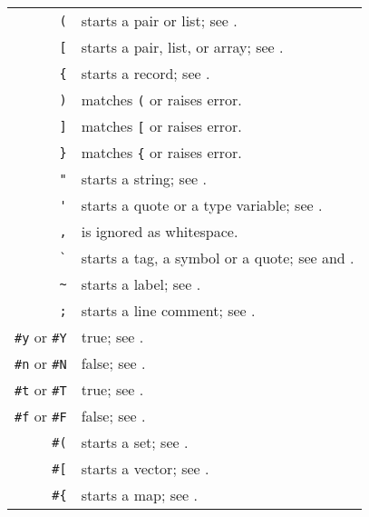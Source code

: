 \begin{table}
\begin{longtable}{ r l }
  \lstinline!(! & starts a pair or list; see \nameref{subsec:aml-base-lang-reader-lists}. \\
  \lstinline![! & starts a pair, list, or array; see \nameref{subsec:aml-base-lang-reader-lists}. \\
  \lstinline!{! & starts a record; see \nameref{subsec:aml-base-lang-reader-records}. \\
  \lstinline!)! & matches \lstinline!(! or raises error. \\
  \lstinline!]! & matches \lstinline![! or raises error. \\
  \lstinline!}! & matches \lstinline!{! or raises error. \\
  
\pagebreak[2]
  \lstinline!"! & starts a string; see \nameref{subsec:aml-base-lang-reader-strings}. \\
  \lstinline!'! & starts a quote or a type variable; see \nameref{subsec:aml-base-lang-reader-quotes}. \\
  \lstinline!,! & is ignored as whitespace. \\
  \lstinline!`! & starts a tag, a symbol or a quote; see \nameref{subsec:aml-base-lang-reader-polytags} and \nameref{subsec:aml-base-lang-reader-symbols}. \\
  \lstinline!~! & starts a label; see \nameref{subsec:aml-base-lang-reader-labels}. \\
  \lstinline!;! & starts a line comment; see \nameref{subsec:aml-base-lang-reader-comments}. \\
  
\pagebreak[2]
  \lstinline!#y! or \lstinline!#Y! & true; see \nameref{subsec:aml-base-lang-reader-booleans}. \\
  \lstinline!#n! or \lstinline!#N! & false; see \nameref{subsec:aml-base-lang-reader-booleans}. \\
  \lstinline!#t! or \lstinline!#T! & true; see \nameref{subsec:aml-base-lang-reader-booleans}. \\
  \lstinline!#f! or \lstinline!#F! & false; see \nameref{subsec:aml-base-lang-reader-booleans}. \\  
  
  \lstinline!#(! & starts a set; see \nameref{subsec:aml-base-lang-reader-sets}. \\
  \lstinline!#[! & starts a vector; see \nameref{subsec:aml-base-lang-reader-vectors}. \\
  \lstinline!#{! & starts a map; see \nameref{subsec:aml-base-lang-reader-maps}. \\
  

\end{longtable}
\end{table}
